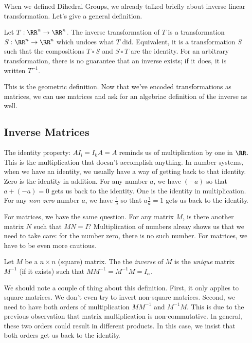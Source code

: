 \documentclass[fleqn]{report}
\begin{document}
When we defined Dihedral Groups, we already talked briefly
about inverse linear transformation. Let's give a general
definition.

\begin{defn}
Let $T: \RR^n \rightarrow \RR^n$. The inverse transformation
of $T$ is a transformation $S: \RR^n \rightarrow \RR^n$ which
undoes what $T$ did. Equivalent, it is a transformation $S$
such that the compositions $T \circ S$ and $S \circ T$ are the
identity. For an arbitrary transformation, there is no
guarantee that an inverse exists; if it does, it is written
$T^{-1}$. 
\end{defn}

This is the geometric definition. Now that we've encoded
transformations as matrices, we can use matrices and ask for
an algebriac definition of the inverse as well.

\subsection{Inverse Matrices}
\label{inverse-matrices}

The identity property: $AI_l = I_k A = A$ reminds us of
multiplication by one in $\RR$. This is the multiplication
that doesn't accomplish anything. In number systems, when we
have an identity, we usually have a way of getting back to
that identity. Zero is the identity in addition. For any
number $a$, we have $(-a)$ so that $a + (-a) = 0$ gets us back
to the identity. One is the identity in multiplication. For
any \emph{non-zero} number $a$, we have $\frac{1}{a}$ so that
$a \frac{1}{a} = 1$ gets us back to the identity. 

For matrices, we have the same question. For any matrix $M$, is
there another matrix $N$ such that $MN = I$? Multiplication
of numbers alreay shows us that we need to take care: for the
number zero, there is no such number. For matrices, we have
to be even more cautious.

\begin{defn}
Let $M$ be a $n \times n$ (square) matrix. The the
\emph{inverse} of $M$ is the \emph{unique} matrix $M^{-1}$ (if
it exists) such that $MM^{-1} = M^{-1}M = I_n$.
\end{defn}

We should note a couple of thing about this definition. First,
it only applies to square matrices. We don't even try to
invert non-square matrices. Second, we need to have both
orders of multiplication $MM^{-1}$ and $M^{-1}M$. This is due
to the previous observation that matrix multiplication is
non-commutative. In general, these two orders could result in
different products. In this case, we insist that both orders
get us back to the identity.
\end{document}
